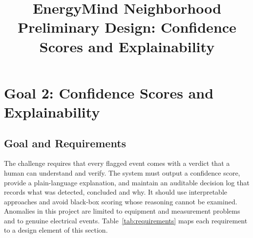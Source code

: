 \documentclass[11pt,a4paper]{article}
\title{EnergyMind Neighborhood\\[2pt]\large Preliminary Design: Confidence Scores and Explainability}
\author{}
\date{}
\begin{document}
\maketitle

\providecommand{\GE}{\texttt{GENUINE\_EVENT}}
\providecommand{\MF}{\texttt{METER\_FAULT}}
\providecommand{\NORM}{\texttt{NORMAL}}

\section{Goal 2: Confidence Scores and Explainability}
\label{sec:goal2}

\subsection{Goal and Requirements}
The challenge requires that every flagged event comes with a verdict that a human can understand and
verify. The system must output a confidence score, provide a plain-language explanation, and maintain an
auditable decision log that records what was detected, concluded and why. It should use interpretable
approaches and avoid black-box scoring whose reasoning cannot be examined. Anomalies in this project are
limited to equipment and measurement problems and to genuine electrical events. Table~\ref{tab:requirements}
maps each requirement to a design element of this section.
\end{document}
